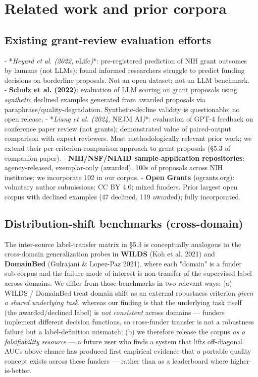 \documentclass[11pt]{article}
\begin{document}
\section{Related work and prior corpora}

\subsection{Existing grant-review evaluation efforts}

- *\emph{Heyard et al. (2022, }eLife\emph{)}*: pre-registered prediction of NIH grant outcomes by humans (not LLMs); found informed researchers struggle to predict funding decisions on borderline proposals. Not an open dataset; not an LLM benchmark.
- \textbf{Schulz et al. (2022)}: evaluation of LLM scoring on grant proposals using \emph{synthetic} declined examples generated from awarded proposals via paraphrase/quality-degradation. Synthetic-decline validity is questionable; no open release.
- *\emph{Liang et al. (2024, }NEJM AI\emph{)}*: evaluation of GPT-4 feedback on conference paper review (not grants); demonstrated value of paired-output comparison with expert reviewers. Most methodologically relevant prior work; we extend their per-criterion-comparison approach to grant proposals (§5.3 of companion paper).
- \textbf{NIH/NSF/NIAID sample-application repositories}: agency-released, exemplar-only (awarded). 100s of proposals across NIH institutes; we incorporate 102 in our corpus.
- \textbf{Open Grants} (ogrants.org): voluntary author submissions; CC BY 4.0; mixed funders. Prior largest open corpus with declined examples (47 declined, 119 awarded); fully incorporated.

\subsection{Distribution-shift benchmarks (cross-domain)}

The inter-source label-transfer matrix in §5.3 is conceptually analogous to the cross-domain generalization probes in \textbf{WILDS} (Koh et al. 2021) and \textbf{DomainBed} (Gulrajani \& Lopez-Paz 2021), where each "domain" is a funder sub-corpus and the failure mode of interest is non-transfer of the supervised label across domains. We differ from those benchmarks in two relevant ways: (a) WILDS / DomainBed treat domain shift as an external robustness criterion \emph{given a shared underlying task}, whereas our finding is that the underlying task itself (the awarded/declined label) is \emph{not consistent} across domains --- funders implement different decision functions, so cross-funder transfer is not a robustness failure but a label-definition mismatch; (b) we therefore release the corpus \emph{as a falsifiability resource} --- a future user who finds a system that lifts off-diagonal AUCs above chance has produced first empirical evidence that a portable quality concept exists across these funders --- rather than as a leaderboard where higher-is-better.
\end{document}
